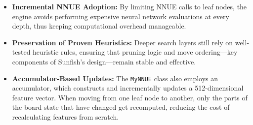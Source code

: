 \documentclass[12pt,a4paper]{article}
\begin{document}
\begin{itemize}
  \item \textbf{Incremental NNUE Adoption:} By limiting NNUE calls to leaf nodes, the engine avoids performing expensive neural network evaluations at every depth, thus keeping computational overhead manageable.
  \item \textbf{Preservation of Proven Heuristics:} Deeper search layers still rely on well-tested heuristic rules, ensuring that pruning logic and move ordering—key components of Sunfish’s design—remain stable and effective.
  \item \textbf{Accumulator-Based Updates:} The \texttt{MyNNUE} class also employs an accumulator, which constructs and incrementally updates a 512-dimensional feature vector. When moving from one leaf node to another, only the parts of the board state that have changed get recomputed, reducing the cost of recalculating features from scratch.
\end{itemize}
\end{document}
